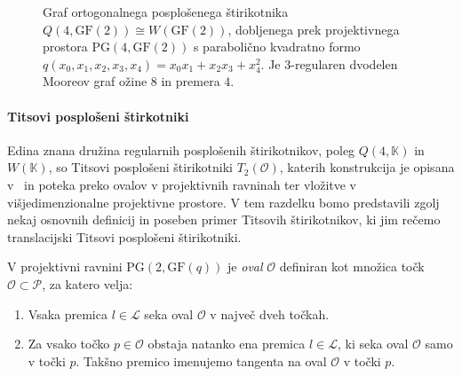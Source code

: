 \documentclass[fin1, tisk]{fmfdelo}
\newcommand{\OO}{\mathcal{O}}
\newcommand{\PP}{\mathcal{P}}
\newcommand{\LL}{\mathcal{L}}
\newcommand{\PG}{\mathrm{PG}}
\newcommand{\GF}{\mathrm{GF}}
\begin{document}
\begin{figure}[htbp]
    \centering
    \caption{Graf ortogonalnega posplošenega štirikotnika $Q(4, \GF(2))\cong W(\GF(2))$, dobljenega prek projektivnega prostora $\PG(4, \GF(2))$
    s parabolično kvadratno formo $q(x_0, x_1, x_2, x_3, x_4) = x_0x_1 + x_2x_3 + x_4^2$.
    Je $3$-regularen dvodelen Mooreov graf ožine $8$ in premera $4$.}
    \label{fig:generalized_quadrangle_gq22}
\end{figure}


\paragraph{Titsovi posplošeni štirkotniki}
Edina znana družina regularnih posplošenih štirikotnikov, poleg $Q(4, \mathbb{K})$ in $W(\mathbb{K})$, so Titsovi posplošeni 
štirikotniki $T_2(\mathcal{O})$, katerih konstrukcija je opisana v~\cite{o2001subquadrangles} in poteka preko ovalov 
v projektivnih ravninah ter vložitve v višjedimenzionalne projektivne prostore. V tem razdelku bomo predstavili 
zgolj nekaj osnovnih definicij in poseben primer Titsovih štirikotnikov, ki jim rečemo translacijski Titsovi posplošeni štirikotniki.



\begin{definicija}
    V projektivni ravnini $\PG(2, \GF(q))$ je \emph{oval} $\OO$ definiran kot množica točk $\OO \subset \PP$, za katero velja:
    \begin{enumerate}[label=(\roman*)]
        \item Vsaka premica $l\in \LL$ seka oval $\OO$ v največ dveh točkah.
        \item Za vsako točko $p\in \OO$ obstaja natanko ena premica $l\in \LL$, ki seka oval $\OO$ samo v točki $p$. 
        Takšno premico imenujemo tangenta na oval $\OO$ v točki $p$.
    \end{enumerate}
\end{definicija}
\end{document}
